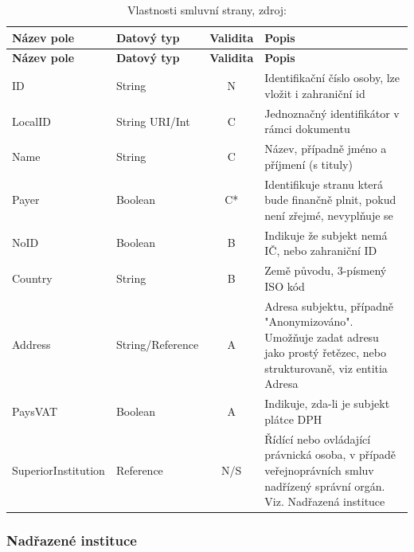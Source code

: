 \begin{center}
\begin{longtable}{lp{20mm}cp{65mm}}
\label{grid_mlmmh} \\
\multicolumn{1}{l}{\textbf{Název pole}} & 
\multicolumn{1}{l}{\textbf{Datový typ}} & 
\multicolumn{1}{l}{\textbf{Validita}} & 
\multicolumn{1}{l}{\textbf{Popis}} \\ \hline 
\endfirsthead
\multicolumn{1}{l}{\textbf{Název pole}} & 
\multicolumn{1}{l}{\textbf{Datový typ}} & 
\multicolumn{1}{l}{\textbf{Validita}} & 
\multicolumn{1}{l}{\textbf{Popis}} \\ \hline 
\hline
\endhead
\endfoot
\caption{Vlastnosti smluvní strany, zdroj:\protect\cite{metodika}}
\endlastfoot
ID & String & N & Identifikační číslo osoby, lze vložit i zahraniční id \\
\rowcolor{validateC}LocalID & String URI/Int & C & Jednoznačný identifikátor v rámci dokumentu \\
\rowcolor{validateC}Name & String & C & Název, případně jméno a příjmení (s tituly) \\
\rowcolor{validateC}Payer & Boolean & C* & Identifikuje stranu která bude finančně plnit, pokud není zřejmé, nevyplňuje se \\
\rowcolor{validateB}NoID & Boolean & B & Indikuje že subjekt nemá IČ, nebo zahraniční ID \\
\rowcolor{validateB}Country & String & B & Země původu, 3-písmený ISO kód \\
\rowcolor{validateA}Address & String/Reference & A & Adresa subjektu, případně "Anonymizováno". Umožňuje zadat adresu jako prostý řetězec, nebo strukturovaně, viz entitia Adresa \\
\rowcolor{validateA}PaysVAT & Boolean & A & Indikuje, zda-li je subjekt plátce DPH \\
\rowcolor{validateS}SuperiorInstitution & Reference & N/S & Řídící nebo ovládající právnická osoba, v případě  veřejnoprávních smluv nadřízený správní orgán. Viz. Nadřazená instituce \\
\end{longtable}
\end{center}

\subsubsection*{Nadřazené instituce}

